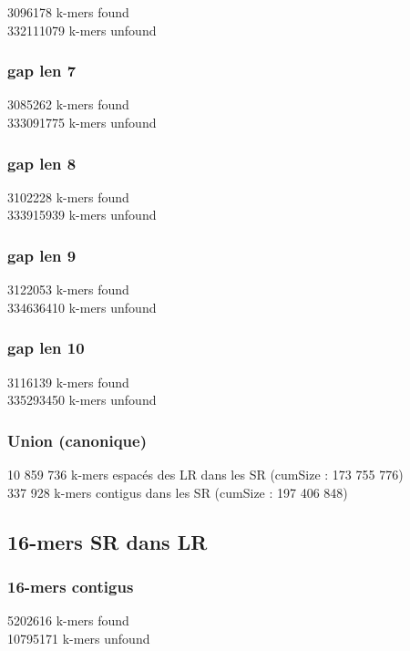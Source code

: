 \documentclass[12pt]{article}
\begin{document}
3096178 k-mers found \\
332111079 k-mers unfound

\subsubsection{gap len 7}

3085262 k-mers found \\
333091775 k-mers unfound

\subsubsection{gap len 8}

3102228 k-mers found \\
333915939 k-mers unfound

\subsubsection{gap len 9}

3122053 k-mers found \\
334636410 k-mers unfound

\subsubsection{gap len 10}

3116139 k-mers found \\
335293450 k-mers unfound

\subsubsection{Union (canonique)}

10 859 736 k-mers espacés des LR dans les SR (cumSize : 173 755 776)\\
 337 928 k-mers contigus dans les SR (cumSize : 197 406 848)

\subsection{16-mers SR dans LR}

\subsubsection{16-mers contigus}

5202616 k-mers found \\
10795171 k-mers unfound
\end{document}
